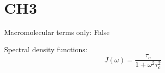 \documentclass[showkeys,aps,prb,prepreint,amssymb, amsmath,nobibnotes]{revtex4}
\begin{document}
\section{CH3}
Macromolecular terms only:  False

Spectral density functions: $$J\left(\omega\right)=\frac{\tau_c}{1+\omega^2\tau_c^2}  $$    
\end{document}
